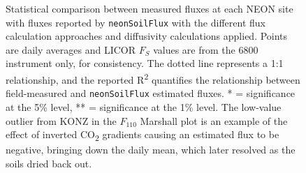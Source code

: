 \documentclass[
  letterpaper,
  DIV=11,
  numbers=noendperiod]{scrartcl}
\begin{document}
\begin{figure}


\caption{\label{fig-r2-plot}Statistical comparison between measured
fluxes at each NEON site with fluxes reported by \texttt{neonSoilFlux}
with the different flux calculation approaches and diffusivity
calculations applied. Points are daily averages and LICOR \(F_{S}\)
values are from the 6800 instrument only, for consistency. The dotted
line represents a 1:1 relationship, and the reported
R\textsuperscript{2} quantifies the relationship between field-measured
and \texttt{neonSoilFlux} estimated fluxes. * = significance at the 5\%
level, ** = significance at the 1\% level. The low-value outlier from
KONZ in the \(F_{110}\) Marshall plot is an example of the effect of
inverted CO\textsubscript{2} gradients causing an estimated flux to be
negative, bringing down the daily mean, which later resolved as the
soils dried back out.}

\end{figure}%
\end{document}
